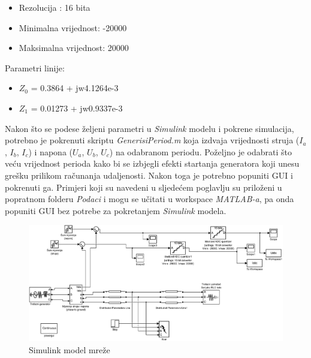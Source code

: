 \begin{itemize}
    \item Rezolucija : 16 bita
    \item Minimalna vrijednost: -20000
    \item Maksimalna vrijednost: 20000
\end{itemize}

Parametri linije:

\begin{itemize}
    \item $Z_0$ = 0.3864 + jw\;4.1264e-3
    \item $Z_1$ = 0.01273 + jw\;0.9337e-3
\end{itemize}

Nakon što se podese željeni parametri u \textit{Simulink} modelu i pokrene simulacija, potrebno je pokrenuti skriptu \textit{GenerisiPeriod.m} koja izdvaja vrijednosti struja ($I_a$, $I_b$, $I_c$) i napona ($U_a$, $U_b$, $U_c$) na odabranom periodu. Poželjno je odabrati što veću vrijednost perioda kako bi se izbjegli efekti startanja generatora koji unesu grešku prilikom računanja udaljenosti. Nakon toga je potrebno popuniti GUI i pokrenuti ga. Primjeri koji su navedeni u sljedećem poglavlju su priloženi u popratnom folderu \textit{Podaci} i mogu se učitati u workspace \textit{MATLAB-a}, pa onda popuniti GUI bez potrebe za pokretanjem \textit{Simulink} modela.

\begin{figure}[H]
  \centering
  \includegraphics[width=1\textwidth]{Rezultati1/model_slika.eps}
  \caption{Simulink model mreže}
  \label{fig:41}
\end{figure}

